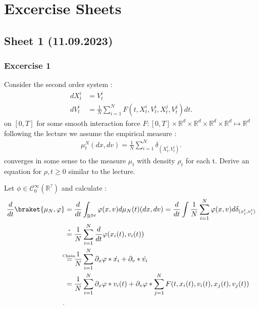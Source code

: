\chapter{Excercise Sheets}
\section{Sheet 1 (11.09.2023)}
\subsection{Excercise 1}
\begin{question}
	Consider the second order system :
	\begin{align*}
		d X_t^i & =  V_t^i                                                    \\
		d V_t^i & = \frac{1}{N} \sum_{i=1}^{N} F(t,X_t^i,V_t^i,X_t^j,V_t^j) dt
		.\end{align*}
	on $[0,T]$ for some smooth interaction force $F : [0,T] \times  \mathbb{R}^{d} \times  \mathbb{R}^{d} \times \mathbb{R}^{d}\times \mathbb{R}^{d} \mapsto \mathbb{R}^{d} $
	following the lecture we assume the empirical measure :
	\begin{align*}
		\mu_{t}^{N }(dx,dv) = \frac{1}{N}  \sum_{i=1}^{N} \delta_{(X_t^i,V_t^i)}
		.\end{align*}
	converges in some sense to the measure $\mu_t$ with density $\rho_t $ for each t.
	Derive an equation for $\rho ,t \ge 0$ similar to the lecture.
\end{question}
\begin{solution}
	Let $\phi  \in  \mathcal{C}_0^{\infty}(\mathbb{R}^{?} ) $ and calculate :
	\begin{align*}
		\frac{d}{dt} \braket{\mu_N,\phi } & =\frac{d}{dt} \int_{\mathbb{R}^{2d} } \phi(x,v) d\mu_N(t)(dx,dv) = \frac{d}{dt}\int \frac{1}{N} \sum_{i=1}^{N} \phi(x,v) d\delta_{(x_i^{t},v_i^{t}  )} \\
                                      & \myS{*}{=} \frac{1}{N} \sum_{i=1}^{N}  \frac{d}{dt} \phi(x_{i}(t),v_i(t)) \\
                                      &\myS{Chain.}{=} \frac{1}{N} \sum_{i=1}^{N} \partial_x \phi * \dot{x_i} + \partial_v * \dot{v_i}    \\
                                      &= \frac{1}{N} \sum_{i=1}^{N} \partial_x \phi*v_i(t)  + \partial_v \phi *\sum_{j=1}^{N} F(t,x_i(t),v_i(t),x_j(t),v_j(t))\\
		.\end{align*}

\end{solution}
